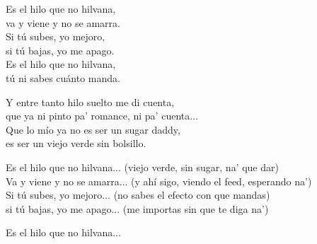\begin{lyrics}
Es el hilo que no hilvana,\\
va y viene y no se amarra.\\
Si tú subes, yo mejoro,\\
si tú bajas, yo me apago.\\
Es el hilo que no hilvana,\\
tú ni sabes cuánto manda.

Y entre tanto hilo suelto me di cuenta,\\
que ya ni pinto pa' romance, ni pa' cuenta...\\
Que lo mío ya no es ser un sugar daddy,\\
es ser un viejo verde sin bolsillo.

Es el hilo que no hilvana...
(viejo verde, sin sugar, na' que dar)\\
Va y viene y no se amarra...
(y ahí sigo, viendo el feed, esperando na')\\
Si tú subes, yo mejoro...
(no sabes el efecto con que mandas)\\
si tú bajas, yo me apago...
(me importas sin que te diga na')

Es el hilo que no hilvana...
\end{lyrics}

